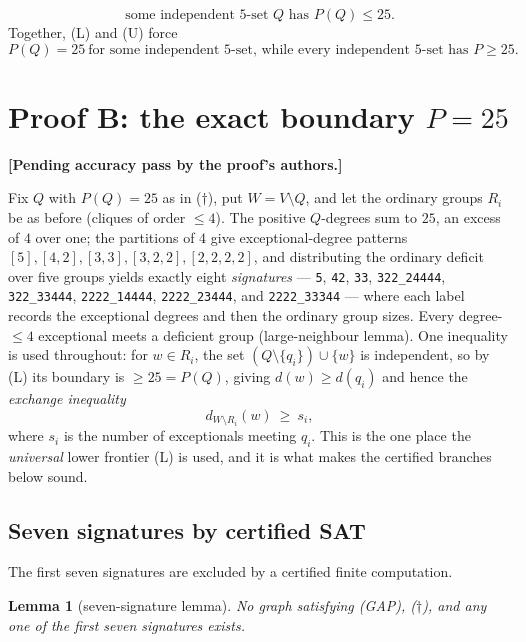 \documentclass[11pt,reqno]{amsart}
\newtheorem{lemma}[theorem]{Lemma}
\theoremstyle{definition}
\theoremstyle{remark}
\newcommand{\pendingB}{%
  \par\nobreak\smallskip\noindent
  \textbf{[Pending accuracy pass by the proof's authors.]}\par\smallskip}
\begin{document}
\begin{equation}
  \text{some independent $5$-set }Q\text{ has }P(Q)\le 25. \tag{U}
\end{equation}
Together, (L) and (U) force
\begin{equation}
  P(Q)=25\ \text{for some independent $5$-set, while every independent $5$-set has }P\ge 25.
  \tag{$\dagger$}
\end{equation}

\section{Proof B: the exact boundary \texorpdfstring{$P=25$}{P=25}}\label{sec:B-exact}
\pendingB

Fix $Q$ with $P(Q)=25$ as in ($\dagger$), put $W=V\setminus Q$, and let the ordinary
groups $R_i$ be as before (cliques of order $\le 4$). The positive $Q$-degrees sum to
$25$, an excess of $4$ over one; the partitions of $4$ give exceptional-degree patterns
$[5],[4,2],[3,3],[3,2,2],[2,2,2,2]$, and distributing the ordinary deficit over five
groups yields exactly eight \emph{signatures} --- \texttt{5}, \texttt{42},
\texttt{33}, \texttt{322\_24444}, \texttt{322\_33444}, \texttt{2222\_14444},
\texttt{2222\_23444}, and \texttt{2222\_33344} --- where each label records the
exceptional degrees and then the ordinary group sizes. Every
degree-$\le 4$ exceptional meets a deficient group (large-neighbour lemma). One inequality
is used throughout: for $w\in R_i$, the set $(Q\setminus\{q_i\})\cup\{w\}$ is independent,
so by (L) its boundary is $\ge 25=P(Q)$, giving $d(w)\ge d(q_i)$ and hence the
\emph{exchange inequality}
\begin{equation}
  d_{W\setminus R_i}(w)\ \ge\ s_i, \tag{E}
\end{equation}
where $s_i$ is the number of exceptionals meeting $q_i$. This is the one place the
\emph{universal} lower frontier (L) is used, and it is what makes the certified branches
below sound.

\subsection{Seven signatures by certified SAT}
The first seven signatures are excluded by a certified finite computation.

\begin{lemma}[seven-signature lemma]\label{lem:B-seven}
No graph satisfying \textup{(GAP)}, \textup{($\dagger$)}, and any one of the first seven
signatures exists.
\end{lemma}
\end{document}
